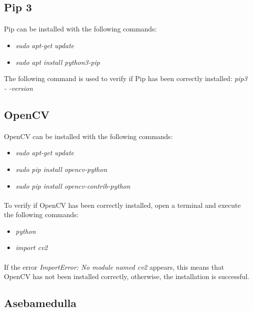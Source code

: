 \documentclass[12pt]{report}
\begin{document}
\subsection{Pip 3}
\paragraph{}
Pip can be installed with the following commands:
\begin{itemize}
	\item \emph{sudo apt-get update}
	\item \emph{sudo apt install python3-pip}
\end{itemize}
The following command is used to verify if Pip has been correctly installed: \emph{pip3 - -version}

\subsection{OpenCV}
\paragraph{}
OpenCV can be installed with the following commands:
\begin{itemize}
	\item \emph{sudo apt-get update}
	\item \emph{sudo pip install opencv-python}
	\item \emph{sudo pip install opencv-contrib-python}
\end{itemize}
\paragraph{}
To verify if OpenCV  has been correctly installed, open a terminal and execute the following commands:
\begin{itemize}
	\item \emph{python}
	\item \emph{import cv2}
\end{itemize}
\paragraph{} 
If the error \emph{ImportError: No module named cv2} appears, this means that OpenCV has not been installed correctly, otherwise, the installation is successful.


\subsection{Asebamedulla}
\end{document}
